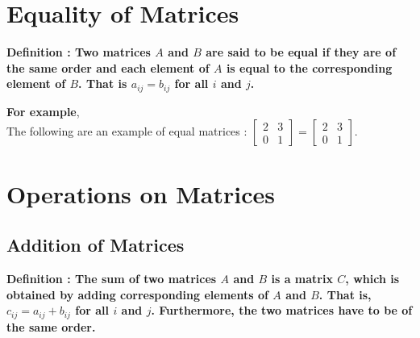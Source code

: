\documentclass[12pt, letterpaper]{article}
\begin{document}
\section{Equality of Matrices}
\begin{displayquote}
\textbf{Definition : Two matrices $A$ and $B$ are said to be equal if they are of the same order and each element of $A$ is equal to the corresponding element of $B$. That is $a_{ij} = b_{ij}$ for all $i$ and $j$.} 
\end{displayquote}
\textbf{For example},\\
The following are an example of equal matrices : 
$\begin{bmatrix}
  2 & 3\\ 
  0 & 1
\end{bmatrix} = \begin{bmatrix}
  2 & 3\\ 
  0 & 1
\end{bmatrix}$.


\section{Operations on Matrices}

\subsection{Addition of Matrices}
\begin{displayquote}
\textbf{Definition : The sum of two matrices $A$ and $B$ is a matrix $C$, which is obtained by adding corresponding elements of $A$ and $B$. That is, $c_{ij} = a_{ij} + b_{ij}$ for all $i$ and $j$. Furthermore, the two matrices have to be of the same order.} 
\end{displayquote}
\end{document}
